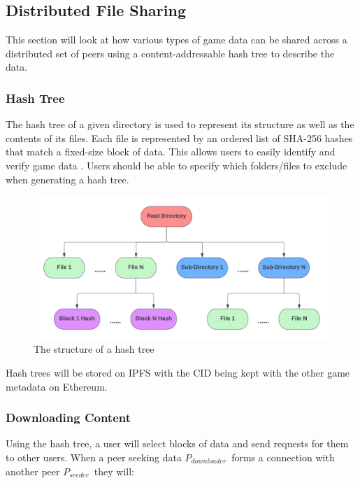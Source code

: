 
\subsection{Distributed File Sharing}
\label{subsec:design-p2p}

This section will look at how various types of game data can be shared across a distributed set of peers using a content-addressable hash tree to describe the data.  

\subsubsection*{Hash Tree}
\label{subsubsec:hash-tree}

The hash tree of a given directory is used to represent its structure as well as the contents of its files. Each file is represented by an ordered list of SHA-256 hashes that match a fixed-size block of data. This allows users to easily identify and verify game data . Users should be able to specify which folders/files to exclude when generating a hash tree.

\begin{figure}[ht]
  \centering
  \includegraphics[width=.85\textwidth]{assets/images/diagrams/block-body.png}
  \caption{The structure of a hash tree}
  \label{fig:hash-storage}
\end{figure}

\newparagraph
Hash trees will be stored on IPFS with the CID being kept with the other game metadata on Ethereum.

\subsubsection*{Downloading Content}

\newcommand{\seeder}{$P_{seeder}$~}
\newcommand{\downloader}{$P_{downloader}$~}

Using the hash tree, a user will select blocks of data and send requests for them to other users. When a peer seeking data \downloader forms a connection with another peer \seeder they will:

